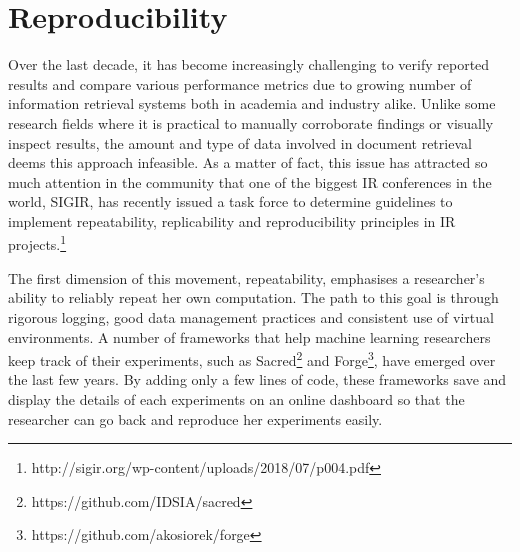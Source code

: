 \section{Reproducibility}

Over the last decade, it has become increasingly challenging to verify reported results and compare various performance metrics due to growing number of information retrieval systems both in academia and industry alike.
Unlike some research fields where it is practical to manually corroborate findings or visually inspect results, the amount and type of data involved in document retrieval deems this approach infeasible.
As a matter of fact, this issue has attracted so much attention in the community that one of the biggest IR conferences in the world, SIGIR, has recently issued a task force to determine guidelines to implement repeatability, replicability and reproducibility principles in IR projects.\footnote{http://sigir.org/wp-content/uploads/2018/07/p004.pdf}

The first dimension of this movement, repeatability, emphasises a researcher's ability to reliably repeat her own computation.
The path to this goal is through rigorous logging, good data management practices and consistent use of virtual environments.
A number of frameworks that help machine learning researchers keep track of their experiments, such as Sacred\footnote{https://github.com/IDSIA/sacred} and Forge\footnote{https://github.com/akosiorek/forge}, have emerged over the last few years.
By adding only a few lines of code, these frameworks save and display the details of each experiments on an online dashboard so that the researcher can go back and reproduce her experiments easily.

